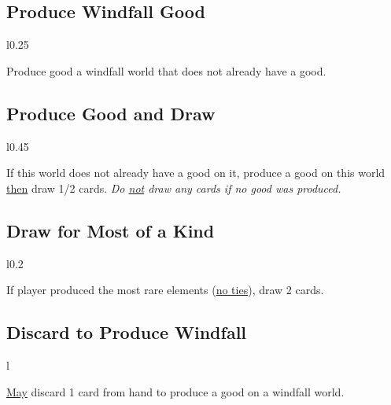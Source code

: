 \documentclass[letterpaper,landscape,twocolumn,8pt]{extarticle}
\begin{document}
\begin{minipage}[t]{\calc{1/3}\columnwidth}
\setlength{\intextsep}{0pt}%

\subsection*{Produce Windfall Good}

\begin{wrapfigure}{l}{0.25\columnwidth}
    
\end{wrapfigure}

Produce good a windfall world that does not already have a good.
\subsection*{Produce Good and Draw}

\begin{wrapfigure}{l}{0.45\columnwidth}
    
    
\end{wrapfigure}

If this world does not already have a good on it, produce a good on this world \underline{then} draw 1/2 cards.
\smallbreak{}
\textit{Do \underline{not} draw any cards if no good was produced.}
\subsection*{Draw for Most of a Kind}

\begin{wrapfigure}{l}{0.2\columnwidth}
    
\end{wrapfigure}

If player produced the most rare elements (\underline{no ties}), draw 2 cards.
\subsection*{Discard to Produce Windfall}

\begin{wrapfigure}{l}{\columnwidth}
    
\end{wrapfigure}

\underline{May} discard 1 card from hand to produce a good on a windfall world.

\end{minipage}
\end{document}
